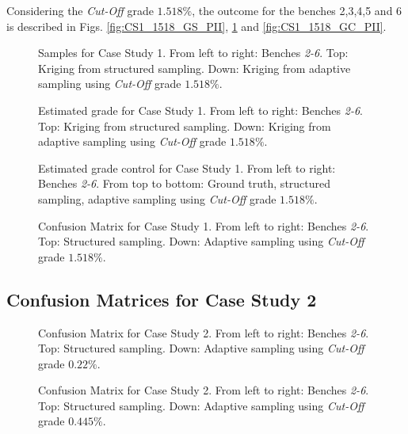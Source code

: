 Considering the \emph{Cut-Off} grade $1.518\%$, the outcome for the benches 2,3,4,5 and 6 is described in Figs. \ref{fig:CS1_1518_GS_PII}, \ref{fig:CS1_1518_EG_PII} and \ref{fig:CS1_1518_GC_PII}.

\begin{figure}[h!]
	\centering
	\caption{\label{fig:CS1_1518_GS_PII} Samples for Case Study 1. From left to right: Benches \emph{2-6}. Top: Kriging from structured sampling. Down: Kriging from adaptive sampling using \emph{Cut-Off} grade $1.518\%$.}
	\centering
	\caption{\label{fig:CS1_1518_EG_PII} Estimated grade for Case Study 1. From left to right: Benches \emph{2-6}. Top: Kriging from structured sampling. Down: Kriging from adaptive sampling using  \emph{Cut-Off} grade $1.518\%$.}
\end{figure}






\begin{figure}[h!]
	\centering
	\caption{\label{fig:CS1_1518_GC_PII} Estimated grade control for Case Study 1. From left to right: Benches \emph{2-6}. From top to bottom: Ground truth,  structured sampling,  adaptive sampling using \emph{Cut-Off} grade $1.518\%$.}
	\centering
	\caption{\label{fig:CS1_1518_CC_PII} Confusion Matrix for Case Study 1. From left to right: Benches \emph{2-6}. Top: Structured sampling. Down: Adaptive sampling using \emph{Cut-Off} grade $1.518\%$.}
\end{figure}

\clearpage
\newpage
\subsection*{Confusion Matrices for Case Study 2}

\begin{figure}[h!]
	\centering
	\caption{\label{fig:CS2_022_CC_PII} Confusion Matrix for Case Study 2. From left to right: Benches \emph{2-6}. Top: Structured sampling. Down: Adaptive sampling using  \emph{Cut-Off} grade $0.22\%$.}
	\centering
	\caption{\label{fig:CS2_0445_CC_PII} Confusion Matrix for Case Study 2. From left to right: Benches \emph{2-6}. Top: Structured sampling. Down: Adaptive sampling using \emph{Cut-Off} grade $0.445\%$.}
\end{figure}
	
